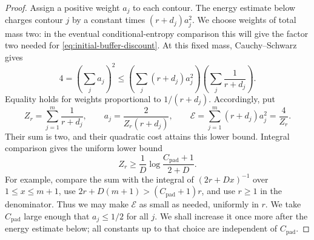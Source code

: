 \begin{proof}
Assign a positive weight $a_j$ to each contour.  The energy estimate below
charges contour $j$ by a constant times
$(r+d_j)a_j^2$.  We choose weights of total mass two: in the eventual
conditional-entropy comparison this will give the factor two needed for
\eqref{eq:initial-buffer-discount}.  At this fixed mass, Cauchy--Schwarz
gives
\[
 4=\left(\sum_j a_j\right)^2
 \le\left(\sum_j(r+d_j)a_j^2\right)
       \left(\sum_j\frac1{r+d_j}\right).
\]
Equality holds for weights proportional to $1/(r+d_j)$.  Accordingly, put
\begin{equation}
 Z_r=\sum_{j=1}^m\frac1{r+d_j},\qquad
 a_j=\frac{2}{Z_r(r+d_j)},\qquad
 \mathcal E=\sum_{j=1}^m(r+d_j)a_j^2=\frac4{Z_r}.
 \label{eq:initial-harmonic-weights}
\end{equation}
Their sum is two, and their quadratic cost attains this lower bound.
Integral comparison gives the uniform lower bound
\begin{equation}
 Z_r\ge\frac1D\log\frac{C_{\mathrm{pad}}+1}{2+D}.
 \label{eq:initial-harmonic-lower}
\end{equation}
For example, compare the sum with the integral of
$(2r+Dx)^{-1}$ over $1\le x\le m+1$, use
$2r+D(m+1)>(C_{\mathrm{pad}}+1)r$, and use $r\ge1$ in the denominator.
Thus we may make $\mathcal E$ as small as needed, uniformly in $r$.
We take $C_{\mathrm{pad}}$ large enough that $a_j\le1/2$ for all $j$.
We shall increase it once more after the energy estimate below; all
constants up to that choice are independent of $C_{\mathrm{pad}}$.


\end{proof}
